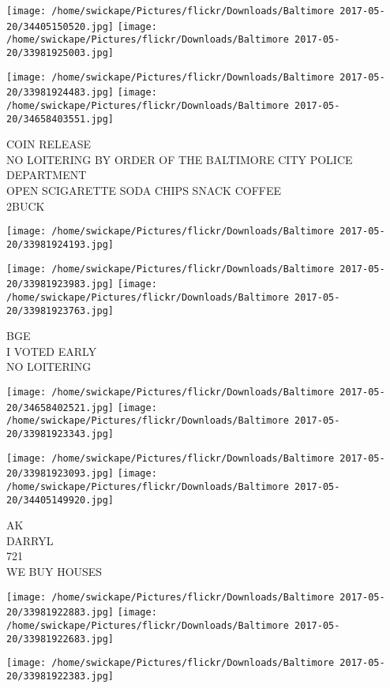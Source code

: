 \documentclass[10pt,letterpaper]{article}
\begin{document}
\texttt{[image: /home/swickape/Pictures/flickr/Downloads/Baltimore 2017-05-20/34405150520.jpg]}
\texttt{[image: /home/swickape/Pictures/flickr/Downloads/Baltimore 2017-05-20/33981925003.jpg]}

\texttt{[image: /home/swickape/Pictures/flickr/Downloads/Baltimore 2017-05-20/33981924483.jpg]}
\texttt{[image: /home/swickape/Pictures/flickr/Downloads/Baltimore 2017-05-20/34658403551.jpg]}

COIN RELEASE\\
NO LOITERING BY ORDER OF THE BALTIMORE CITY POLICE DEPARTMENT\\
OPEN SCIGARETTE SODA CHIPS SNACK COFFEE\\
2BUCK
\pagebreak

\texttt{[image: /home/swickape/Pictures/flickr/Downloads/Baltimore 2017-05-20/33981924193.jpg]}

\vspace{0.25in}
\texttt{[image: /home/swickape/Pictures/flickr/Downloads/Baltimore 2017-05-20/33981923983.jpg]}
\texttt{[image: /home/swickape/Pictures/flickr/Downloads/Baltimore 2017-05-20/33981923763.jpg]}

BGE\\
I VOTED EARLY\\
NO LOITERING
\pagebreak

\texttt{[image: /home/swickape/Pictures/flickr/Downloads/Baltimore 2017-05-20/34658402521.jpg]}
\texttt{[image: /home/swickape/Pictures/flickr/Downloads/Baltimore 2017-05-20/33981923343.jpg]}

\texttt{[image: /home/swickape/Pictures/flickr/Downloads/Baltimore 2017-05-20/33981923093.jpg]}
\texttt{[image: /home/swickape/Pictures/flickr/Downloads/Baltimore 2017-05-20/34405149920.jpg]}

AK\\
DARRYL\\
721\\
WE BUY HOUSES
\pagebreak

\texttt{[image: /home/swickape/Pictures/flickr/Downloads/Baltimore 2017-05-20/33981922883.jpg]}
\texttt{[image: /home/swickape/Pictures/flickr/Downloads/Baltimore 2017-05-20/33981922683.jpg]}

\vspace{0.25in}
\texttt{[image: /home/swickape/Pictures/flickr/Downloads/Baltimore 2017-05-20/33981922383.jpg]}
\end{document}
